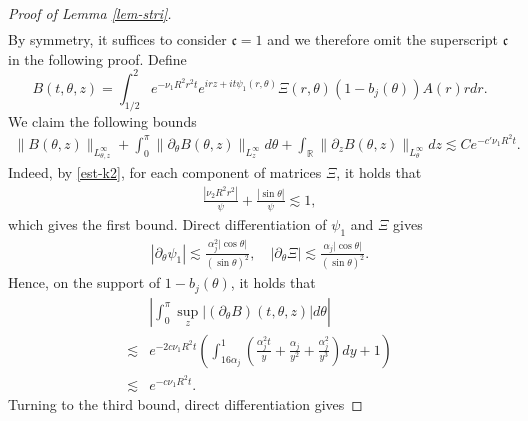 \documentclass[12pt]{article}
\numberwithin{equation}{section}
\begin{document}
\begin{proof}[Proof of Lemma \ref{lem-stri}]
\begin{align*}
  	\end{align*}
    By symmetry, it suffices to consider $\mathfrak{c}=1$ and we therefore omit the superscript $\mathfrak{c}$ in the following proof.
  	Define
  	\begin{equation*}
  		B(t,\theta,z)=\int_{1/2}^{2}e^{-\nu_1 R^2 r^2 t}e^{irz+it\psi_1(r,\theta)}\Xi(r,\theta)(1-b_j(\theta))A(r)r dr.
  	\end{equation*}
    We claim the following bounds
  	\begin{align}\label{est-B}
  		\|B(\theta,z)\|_{L^\infty_{\theta,z}}+\int_{0}^{\pi}\|\partial_{\theta}B(\theta,z)\|_{L^\infty_{z}}d\theta+\int_{\mathbb{R}}\|\partial_{z}B(\theta,z)\|_{L^\infty_{\theta}}dz\lesssim C e^{-c'\nu_1R^2t}.
  	\end{align}
  	Indeed, by \eqref{est-k2}, for each component of matrices $\Xi$, it holds that
  	\begin{align*}
  		\frac{|\nu_2 R^2r^2|}{\psi}+\frac{|\sin\theta|}{\psi}\lesssim 1,
  	\end{align*} 
    which gives the first bound. Direct differentiation of $\psi_1$ and $\Xi$ gives 
    \begin{align*}
        |\partial_{\theta}\psi_1|\lesssim\frac{\alpha^2_j|\cos\theta|}{(\sin\theta)^2},\quad |\partial_{\theta}\Xi|\lesssim\frac{\alpha_j|\cos\theta|}{(\sin\theta)^2}.
    \end{align*}
    Hence, on the support of  $1-b_j(\theta)$, it holds that
    \begin{align*}
  		&\left| \int_0^{\pi}\sup_{z}|(\partial_{\theta}B)(t,\theta,z)|d\theta\right|\\
  		\lesssim&e^{-2c\nu_1R^2t}\left(\int_{16\alpha_j}^{1}\left(\frac{\alpha_j^2t}{y}+\frac{\alpha_j}{y^2}+\frac{\alpha_j^2}{y^3} \right)dy+1\right)\\
  		\lesssim&e^{-c\nu_1R^2t}.
  	\end{align*}
    \color{black}
  	Turning to the third bound, direct differentiation gives 

\end{proof}
\end{document}
